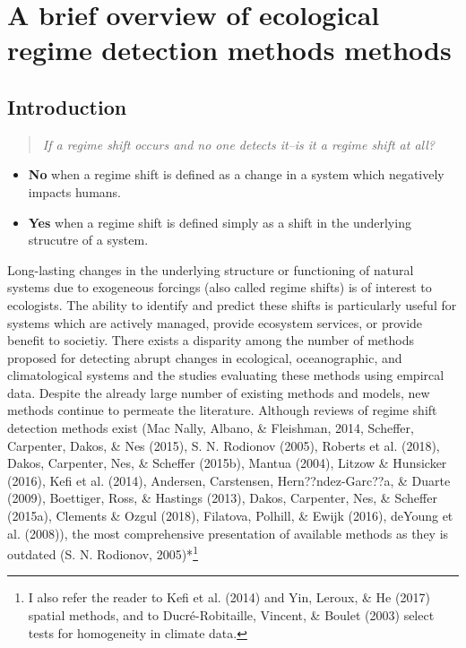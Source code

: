 \documentclass[12pt,twoside,openany]{reedthesis}
\providecommand{\tightlist}{%
  \setlength{\itemsep}{0pt}\setlength{\parskip}{0pt}}
\begin{document}
\chapter{A brief overview of ecological regime detection methods
methods}\label{rdmReview-chapter}

\section{Introduction}\label{introduction}
\begin{quote}
\emph{If a regime shift occurs and no one detects it--is it a regime
shift at all?}
\end{quote}
\begin{itemize}
\tightlist
\item
  \textbf{No} when a regime shift is defined as a change in a system
  which negatively impacts humans.
\item
  \textbf{Yes} when a regime shift is defined simply as a shift in the
  underlying strucutre of a system.
\end{itemize}
Long-lasting changes in the underlying structure or functioning of
natural systems due to exogeneous forcings (also called regime shifts)
is of interest to ecologists. The ability to identify and predict these
shifts is particularly useful for systems which are actively managed,
provide ecosystem services, or provide benefit to societiy. There exists
a disparity among the number of methods proposed for detecting abrupt
changes in ecological, oceanographic, and climatological systems and the
studies evaluating these methods using empircal data. Despite the
already large number of existing methods and models, new methods
continue to permeate the literature. Although reviews of regime shift
detection methods exist (Mac Nally, Albano, \& Fleishman, 2014,
Scheffer, Carpenter, Dakos, \& Nes (2015), S. N. Rodionov (2005),
Roberts et al. (2018), Dakos, Carpenter, Nes, \& Scheffer (2015b),
Mantua (2004), Litzow \& Hunsicker (2016), Kefi et al. (2014), Andersen,
Carstensen, Hern??ndez-Garc??a, \& Duarte (2009), Boettiger, Ross, \&
Hastings (2013), Dakos, Carpenter, Nes, \& Scheffer (2015a), Clements \&
Ozgul (2018), Filatova, Polhill, \& Ewijk (2016), deYoung et al.
(2008)), the most comprehensive presentation of available methods as
they is outdated (S. N. Rodionov, 2005)*\footnote{I also refer the
  reader to Kefi et al. (2014) and Yin, Leroux, \& He (2017) spatial
  methods, and to Ducré-Robitaille, Vincent, \& Boulet (2003) select
  tests for homogeneity in climate data.}
\end{document}
